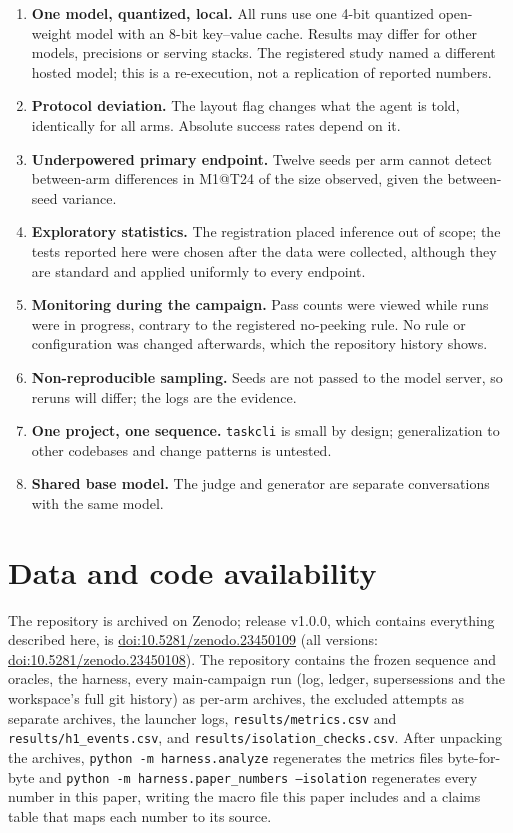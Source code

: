 \documentclass[11pt]{article}
\begin{document}
\begin{enumerate}
\item \textbf{One model, quantized, local.} All runs use one 4-bit quantized
open-weight model with an 8-bit key--value cache. Results may differ for other
models, precisions or serving stacks. The registered study named a different
hosted model; this is a re-execution, not a replication of reported numbers.
\item \textbf{Protocol deviation.} The layout flag changes what the agent is
told, identically for all arms. Absolute success rates depend on it.
\item \textbf{Underpowered primary endpoint.} Twelve seeds per arm cannot
detect between-arm differences in M1@T24 of the size observed, given the
between-seed variance.
\item \textbf{Exploratory statistics.} The registration placed inference out
of scope; the tests reported here were chosen after the data were collected,
although they are standard and applied uniformly to every endpoint.
\item \textbf{Monitoring during the campaign.} Pass counts were viewed while
runs were in progress, contrary to the registered no-peeking rule. No rule or
configuration was changed afterwards, which the repository history shows.
\item \textbf{Non-reproducible sampling.} Seeds are not passed to the model
server, so reruns will differ; the logs are the evidence.
\item \textbf{One project, one sequence.} \texttt{taskcli} is small by design;
generalization to other codebases and change patterns is untested.
\item \textbf{Shared base model.} The judge and generator are separate
conversations with the same model.
\end{enumerate}

\section{Data and code availability}
\label{sec:availability}

The repository is archived on Zenodo; release v1.0.0, which contains
everything described here, is \href{https://doi.org/10.5281/zenodo.23450109}{doi:10.5281/zenodo.23450109}
(all versions: \href{https://doi.org/10.5281/zenodo.23450108}{doi:10.5281/zenodo.23450108}).
The repository contains the frozen sequence and oracles, the harness, every
main-campaign run (log, ledger, supersessions and the workspace's full git
history) as per-arm archives, the excluded attempts as separate archives, the
launcher logs, \texttt{results/metrics.csv} and
\texttt{results/h1\_events.csv}, and \texttt{results/isolation\_checks.csv}.
After unpacking the archives, \texttt{python -m harness.analyze} regenerates
the metrics files byte-for-byte and \texttt{python -m harness.paper\_numbers
--isolation} regenerates every number in this paper, writing the macro file
this paper includes and a claims table that maps each number to its source.
\end{document}
